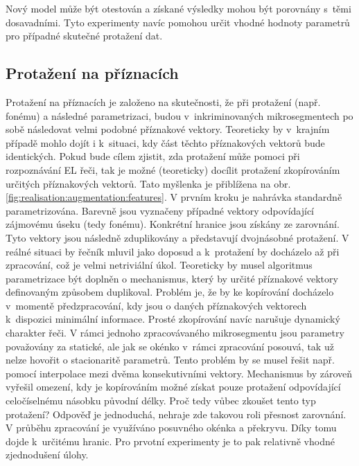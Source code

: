 \noindent Nový model může být otestován a získané výsledky mohou být porovnány s~těmi dosavadními.
Tyto experimenty navíc pomohou určit vhodné hodnoty parametrů pro případné skutečné protažení dat.


\subsection{Protažení na příznacích}
\label{chap:realisation:augmentation:features}

Protažení na příznacích je založeno na skutečnosti, že při protažení (např. fonému) a následné parametrizaci, budou v~inkriminovaných mikrosegmentech po sobě následovat velmi podobné příznakové vektory.
Teoreticky by v~krajním případě mohlo dojít i  k~situaci, kdy část těchto příznakových vektorů bude identických.
Pokud bude cílem zjistit, zda protažení může pomoci při rozpoznávání EL řeči, tak je možné (teoreticky) docílit protažení zkopírováním určitých příznakových vektorů.
Tato myšlenka je přiblížena na obr. \ref{fig:realisation:augmentation:features}.
V prvním kroku je nahrávka standardně parametrizována.
Barevně jsou vyznačeny případné vektory odpovídající zájmovému úseku (tedy fonému).
Konkrétní hranice jsou získány ze zarovnání.
Tyto vektory jsou následně zduplikovány a představují dvojnásobné protažení.
V reálné situaci by řečník mluvil jako doposud a  k~protažení by docházelo až při zpracování, což je velmi netriviální úkol.
Teoreticky by musel algoritmus parametrizace být doplněn o mechanismus, který by určité příznakové vektory definovaným způsobem duplikoval.
Problém je, že by ke kopírování docházelo v~momentě předzpracování, kdy jsou o daných příznakových vektorech k~dispozici minimální informace.
Prosté zkopírování navíc narušuje dynamický charakter řeči.
V rámci jednoho zpracovávaného mikrosegmentu jsou parametry považovány za statické, ale jak se okénko v~rámci zpracování posouvá, tak už nelze hovořit o stacionaritě parametrů.
Tento problém by se musel řešit např. pomocí interpolace mezi dvěma konsekutivními vektory.
Mechanismus by zároveň vyřešil omezení, kdy je kopírováním možné získat pouze protažení odpovídající celočíselnému násobku původní délky.
Proč tedy vůbec zkoušet tento typ protažení?
Odpověď je jednoduchá, nehraje zde takovou roli přesnost zarovnání.
V průběhu zpracování je využíváno posuvného okénka a překryvu.
Díky tomu dojde  k~určitému  hranic.
Pro prvotní experimenty je to pak relativně vhodné zjednodušení úlohy.

